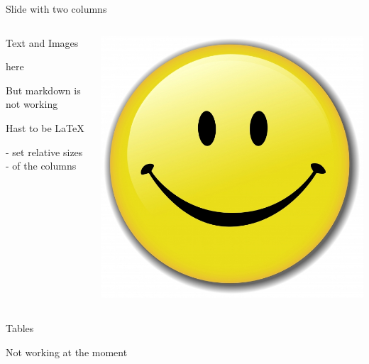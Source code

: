 \begin{frame}{Slide with two columns}

\begin{columns}\begin{column}{0.6\textwidth}\center

  Text and Images

  here

  But markdown is not working

  Hast to be \LaTeX

  - set relative sizes
  - of the columns 

\end{column}\begin{column}{0.4\textwidth}\center

\includegraphics[width=\textwidth,height=\textheight,keepaspectratio]{images/smile}

\end{column}\end{columns}

\end{frame}

\begin{frame}{Tables}

Not working at the moment

\end{frame}
